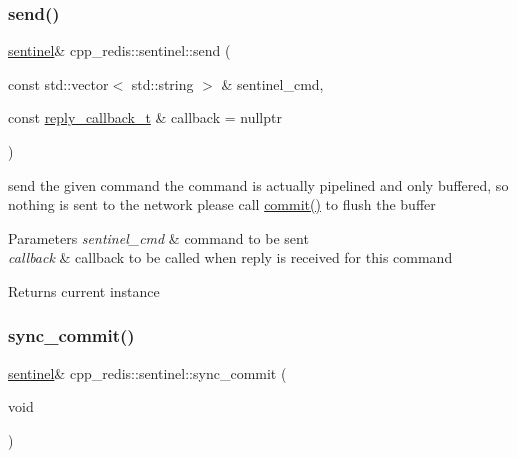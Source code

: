 \subsubsection{\texorpdfstring{send()}{send()}}
{\footnotesize\ttfamily \mbox{\hyperlink{classcpp__redis_1_1sentinel}{sentinel}}\& cpp\+\_\+redis\+::sentinel\+::send (\begin{DoxyParamCaption}\item[{const std\+::vector$<$ std\+::string $>$ \&}]{sentinel\+\_\+cmd,  }\item[{const \mbox{\hyperlink{classcpp__redis_1_1sentinel_ae1a150ff8787208c47414397a061c9a7}{reply\+\_\+callback\+\_\+t}} \&}]{callback = {\ttfamily nullptr} }\end{DoxyParamCaption})}

send the given command the command is actually pipelined and only buffered, so nothing is sent to the network please call \mbox{\hyperlink{classcpp__redis_1_1sentinel_ad4f85d486499f82225b244f85091b31e}{commit()}} to flush the buffer


\begin{DoxyParams}{Parameters}
{\em sentinel\+\_\+cmd} & command to be sent \\
\hline
{\em callback} & callback to be called when reply is received for this command \\
\hline
\end{DoxyParams}
\begin{DoxyReturn}{Returns}
current instance 
\end{DoxyReturn}
\mbox{\label{classcpp__redis_1_1sentinel_a8e4d231ac89510c337fe97fe9e642785}} 
\subsubsection{\texorpdfstring{sync\+\_\+commit()}{sync\_commit()}\hspace{0.1cm}{\footnotesize\ttfamily [1/2]}}
{\footnotesize\ttfamily \mbox{\hyperlink{classcpp__redis_1_1sentinel}{sentinel}}\& cpp\+\_\+redis\+::sentinel\+::sync\+\_\+commit (\begin{DoxyParamCaption}\item[{void}]{ }\end{DoxyParamCaption})}

